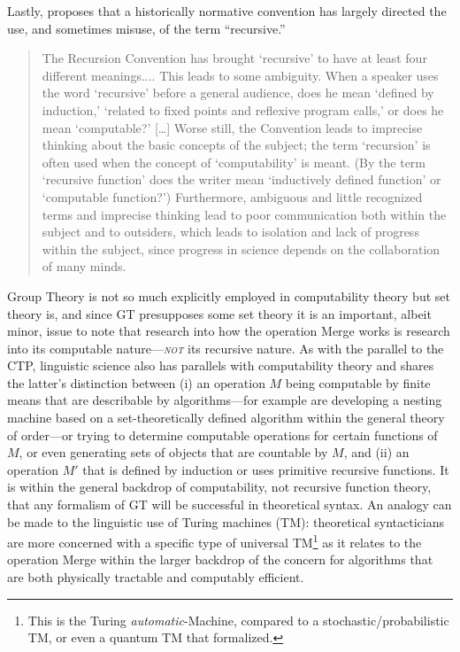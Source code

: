 \documentclass[11pt,twoside]{article}
\theoremstyle{plain}
\numberwithin{equation}{section}
\theoremstyle{definition}
\newtheorem{phrase string}{Phrase String}
\begin{document}
Lastly, \cite[29]{soare:1996} proposes that a historically normative convention has largely directed the use, and sometimes misuse, of the term ``recursive.''
	\begin{quotation} 
	The Recursion Convention has brought `recursive' to have at least four different 	meanings.... This leads to some ambiguity. When a speaker uses the word 	`recursive' before a general audience, does he mean `defined by induction,' `related to fixed points and reflexive program calls,' or does he mean 	`computable?' [\ldots] Worse still, the Convention leads to imprecise thinking about 	the basic concepts of the subject; the term `recursion' is often used when the 	concept of `computability' is meant. (By the term `recursive function' does the 	writer mean `inductively defined function' or `computable function?') 	Furthermore, ambiguous and little recognized terms and imprecise thinking lead 	to poor communication both within the subject and to outsiders, which leads to 	isolation and lack of progress within the subject, since progress in science 	depends on the collaboration of many minds.
  \end{quotation}

Group Theory is not so much explicitly employed in computability theory but set theory is, and since GT presupposes some set theory it is an important, albeit minor, issue to note that research into how the operation Merge works is research into its computable nature---\textsl{\textsc{not}} its recursive nature. As with the parallel to the CTP, linguistic science also has parallels with computability theory and shares the latter's distinction between (i) an operation $M$ being computable by finite means that are describable by algorithms---for example \cite{fortcm:toappear} are developing a nesting machine based on a set-theoretically defined algorithm within the general theory of order---or trying to determine computable operations for certain functions of $M$, or even generating sets of objects that are countable by $M$, and (ii) an operation $M'$ that is defined by induction or uses primitive recursive functions. It is within the general backdrop of computability, not recursive function theory, that any formalism of GT will be successful in theoretical syntax. An analogy can be made to the linguistic use of Turing machines (TM): theoretical syntacticians are more concerned with a specific type of universal TM\footnote{This is the Turing \textsl{automatic}-Machine, compared to a stochastic/probabilistic TM, or even a quantum TM that \cite{deutsch:1985} formalized.} as it relates to the operation Merge within the larger backdrop of the concern for algorithms that are both physically tractable and computably efficient.
\end{document}
